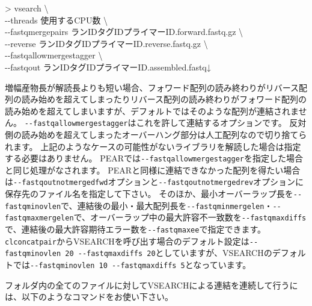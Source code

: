 \documentclass[titlepage,10pt,a4paper]{jsbook}
\newenvironment{cmd}{\begin{oframed}\raggedright\ttfamily\footnotesize\setlength{\baselineskip}{1.4em}}{\end{oframed}\vspace{-1em}}
\begin{document}
\begin{cmd}
{\textgreater} vsearch {\textbackslash}\\
{-}{-}threads 使用するCPU数 {\textbackslash}\\
{-}{-}fastq{\textunderscore}mergepairs ランID{\textunderscore}{\textunderscore}タグID{\textunderscore}{\textunderscore}プライマーID.forward.fastq.gz {\textbackslash}\\
{-}{-}reverse ランID{\textunderscore}{\textunderscore}タグID{\textunderscore}{\textunderscore}プライマーID.reverse.fastq.gz {\textbackslash}\\
{-}{-}fastq{\textunderscore}allowmergestagger {\textbackslash}\\
{-}{-}fastqout ランID{\textunderscore}{\textunderscore}タグID{\textunderscore}{\textunderscore}プライマーID.assembled.fastq↓
\end{cmd}

増幅産物長が解読長よりも短い場合、フォワード配列の読み終わりがリバース配列の読み始めを超えてしまったりリバース配列の読み終わりがフォワード配列の読み始めを超えてしまいますが、デフォルトではそのような配列が連結されません。
\texttt{{-}{-}fastq{\textunderscore}allowmergestagger}はこれを許して連結するオプションです。
反対側の読み始めを超えてしまったオーバーハング部分は人工配列なので切り捨てられます。
上記のようなケースの可能性がないライブラリを解読した場合は指定する必要はありません。
PEARでは\texttt{{-}{-}fastq{\textunderscore}allowmergestagger}を指定した場合と同じ処理がなされます。
PEARと同様に連結できなかった配列を得たい場合は\texttt{{-}{-}fastqout{\textunderscore}notmerged{\textunderscore}fwd}オプションと\texttt{{-}{-}fastqout{\textunderscore}notmerged{\textunderscore}rev}オプションに保存先のファイル名を指定して下さい。
そのほか、最小オーバーラップ長を\texttt{{-}{-}fastq{\textunderscore}minovlen}で、連結後の最小・最大配列長を\texttt{{-}{-}fastq{\textunderscore}minmergelen}・\texttt{{-}{-}fastq{\textunderscore}maxmergelen}で、オーバーラップ中の最大許容不一致数を\texttt{{-}{-}fastq{\textunderscore}maxdiffs}で、連結後の最大許容期待エラー数を\texttt{{-}{-}fastq{\textunderscore}maxee}で指定できます。
\texttt{clconcatpair}からVSEARCHを呼び出す場合のデフォルト設定は\texttt{{-}{-}fastq{\textunderscore}minovlen 20 {-}{-}fastq{\textunderscore}maxdiffs 20}としていますが、VSEARCHのデフォルトでは\texttt{{-}{-}fastq{\textunderscore}minovlen 10 {-}{-}fastq{\textunderscore}maxdiffs 5}となっています。

フォルダ内の全てのファイルに対してVSEARCHによる連結を連続して行うには、以下のようなコマンドをお使い下さい。
\end{document}
